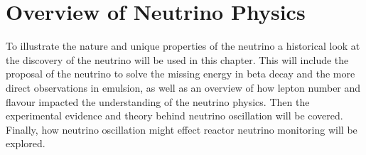 

\ifpdf
    \graphicspath{{Chapter2/Figs/Raster/}{Chapter2/Figs/PDF/}{Chapter2/Figs/}}
\else
    \graphicspath{{Chapter2/Figs/Vector/}{Chapter2/Figs/}}
\fi


\chapter{Overview of Neutrino Physics}\label{Chp:ABfriefHistoryOfNeutrinos} 
To illustrate the nature and unique properties of the neutrino a historical look at the discovery of the neutrino will be used in this chapter. This will include the proposal of the neutrino to solve the missing energy in beta decay and the more direct observations in emulsion, as well as an overview of how lepton number and flavour impacted the understanding of the neutrino physics. Then the experimental evidence and theory behind neutrino oscillation will be covered. Finally, how neutrino oscillation might effect reactor neutrino monitoring will be explored. %

